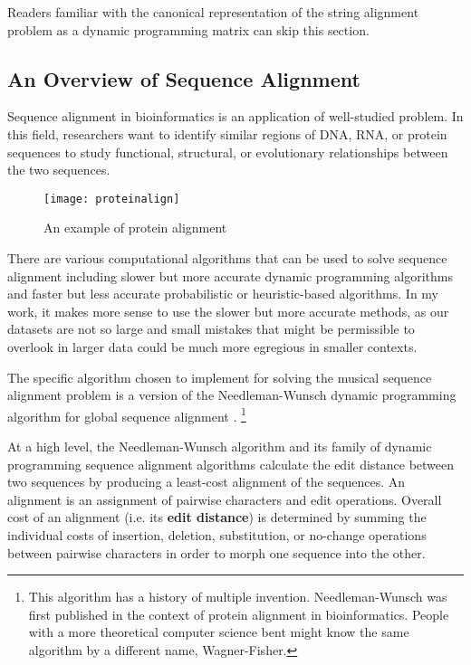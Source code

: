 Readers familiar with the canonical representation of the string alignment problem as a dynamic programming matrix can skip this section. 

\subsection{An Overview of Sequence Alignment}
Sequence alignment in bioinformatics is an application of well-studied problem. In this field, researchers want to identify similar regions of DNA, RNA, or protein sequences to study functional, structural, or evolutionary relationships between the two sequences.

\begin{figure}[!ht]

\centering
\texttt{[image: proteinalign]}
\caption{An example of protein alignment \cite{proteins}}
\end{figure}

There are various computational algorithms that can be used to solve sequence alignment including slower but more accurate dynamic programming algorithms and faster but less accurate probabilistic or heuristic-based algorithms. In my work, it makes more sense to use the slower but more accurate methods, as our datasets are not so large and small mistakes that might be permissible to overlook in larger data could be much more egregious in smaller contexts.

The specific algorithm chosen to implement for solving the musical sequence alignment problem is a version of the Needleman-Wunsch dynamic programming algorithm for global sequence alignment \cite{needleman}. \footnote{This algorithm has a history of multiple invention. Needleman-Wunsch was first published in the context of protein alignment in bioinformatics. People with a more theoretical computer science bent might know the same algorithm by a different name, Wagner-Fisher.} 

At a high level, the Needleman-Wunsch algorithm and its family of dynamic programming sequence alignment algorithms calculate the edit distance between two sequences by producing a least-cost alignment of the sequences. An alignment is an assignment of pairwise characters and edit operations. Overall cost of an alignment (i.e. its \textbf{edit distance}) is determined by summing the individual costs of insertion, deletion, substitution, or no-change operations between pairwise characters in order to morph one sequence into the other. 

